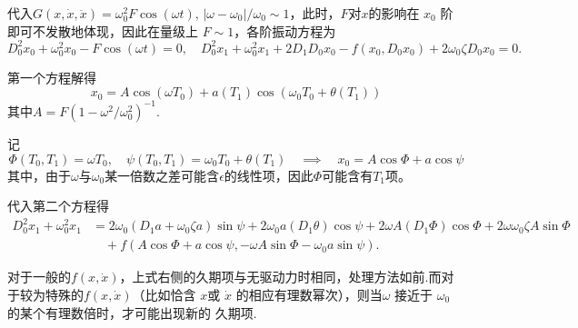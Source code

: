 代入\(G (x, \dot{x}, \ddot{x}) = \omega_0^2 F \cos(\omega t),\,|\omega - \omega_0|/\omega_0\sim 1\)，此时，\(F\)对\(x\)的影响在 \(x_0\) 阶即可不发散地体现，因此在量级上 \(F \sim 1\)，各阶振动方程为
\begin{equation*}
	D_0^2 x_0 + \omega_0^2 x_0 - F \cos(\omega t) = 0,\quad
	D_0^2 x_1 + \omega_0^2 x_1 + 2 D_1 D_0 x_0 - f(x_0, D_0 x_0) + 2 \omega_0 \zeta D_0 x_0 = 0.
\end{equation*}

第一个方程解得
\begin{equation*}
	x_0 = A \cos(\omega T_0) + a(T_1) \cos(\omega_0 T_0 + \theta(T_1))
\end{equation*}
其中\(A = F \left( 1 - \omega^2/\omega_0^2 \right)^{-1}\).

记
\begin{equation*}
	\Phi(T_0, T_1) = \omega T_0,\quad \psi(T_0, T_1) = \omega_0 T_0 + \theta(T_1)\quad\implies\quad x_0 = A \cos\Phi + a \cos\psi
\end{equation*}
其中，由于\(\omega\)与\(\omega_0\)某一倍数之差可能含\(\epsilon\)的线性项，因此\(\Phi\)可能含有\(T_1\)项。

代入第二个方程得
\begin{equation*}
	\begin{aligned}
		D_0^2 x_1 + \omega_0^2 x_1 & = 2 \omega_0 \left( D_1 a + \omega_0 \zeta a \right) \sin\psi + 2 \omega_0 a (D_1 \theta) \cos\psi + 2 \omega A (D_1 \Phi) \cos\Phi + 2 \omega \omega_0 \zeta A \sin\Phi \\
		                           & \quad + f\left( A \cos\Phi + a \cos\psi, -\omega A \sin\Phi - \omega_0 a \sin\psi \right).
	\end{aligned}
\end{equation*}

对于一般的\(f(x, \dot{x})\)，上式右侧的久期项与无驱动力时相同，处理方法如前.而对于较为特殊的\(f(x, \dot{x})\)（比如恰含 \(x\)或 \(\dot{x}\) 的相应有理数幂次），则当\(\omega\) 接近于 \(\omega_0\) 的某个有理数倍时，才可能出现新的 久期项.

